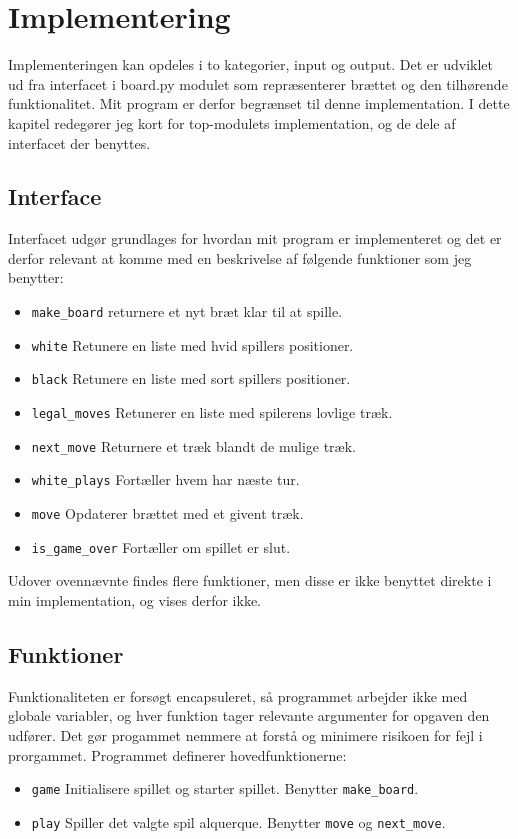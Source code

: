 \documentclass{article}
\begin{document}
%
\newpage
\section{Implementering}
Implementeringen kan opdeles i to kategorier, input og output. 
Det er udviklet ud fra interfacet i board.py modulet som repræsenterer brættet og den tilhørende funktionalitet.
Mit program er derfor begrænset til denne implementation. 
I dette kapitel redegører jeg kort for top-modulets implementation, 
og de dele af interfacet der benyttes.

\subsection{Interface}
Interfacet udgør grundlages for hvordan mit program er implementeret og det er derfor
relevant at komme med en beskrivelse af følgende funktioner som jeg benytter:

\begin{itemize}
    \item \texttt{make\_board} returnere et nyt bræt klar til at spille.
    \item \texttt{white} Retunere en liste med hvid spillers positioner.
    \item \texttt{black} Retunere en liste med sort spillers positioner.
    \item \texttt{legal\_moves} Retunerer en liste med spilerens lovlige træk.
    \item \texttt{next\_move} Returnere et træk blandt de mulige træk.
    \item \texttt{white\_plays} Fortæller hvem har næste tur.
    \item \texttt{move} Opdaterer brættet med et givent træk.
    \item \texttt{is\_game\_over} Fortæller om spillet er slut.
\end{itemize}
Udover ovennævnte findes flere funktioner, men disse er ikke benyttet direkte i min implementation, og vises derfor ikke. 

\newpage
\subsection{Funktioner}
Funktionaliteten er forsøgt encapsuleret, så programmet arbejder ikke med globale variabler,
og hver funktion tager relevante argumenter for opgaven den udfører. Det gør progammet nemmere at forstå og minimere 
risikoen for fejl i prorgammet.
\bigbreak
Programmet definerer hovedfunktionerne:
\begin{itemize}
    \item \texttt{game} Initialisere spillet og starter spillet. Benytter \texttt{make\_board}.
    \item \texttt{play} Spiller det valgte spil alquerque. Benytter \texttt{move} og \texttt{next\_move}.
\end{itemize}
\end{document}
